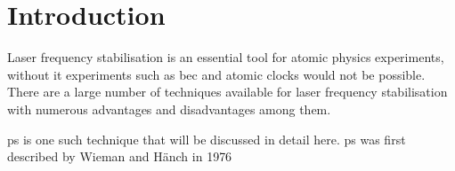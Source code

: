 \section{Introduction}

Laser frequency stabilisation is an essential tool for atomic physics experiments, without it experiments such as \gls{bec} and atomic clocks would not be possible. There are a large number of techniques available for laser frequency stabilisation with numerous advantages and disadvantages among them.

\Gls{ps} is one such technique that will be discussed in detail here.  \Gls{ps} was first described by Wieman and H\"anch in 1976\cite{wieman_doppler-free_1976}
